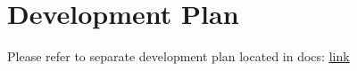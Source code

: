 \section{Development Plan}

Please refer to separate development plan located in docs: \href{https://github.com/John-Popovici/duel-of-the-eights/blob/main/docs/DevelopmentPlan/DevelopmentPlan.pdf}{link}